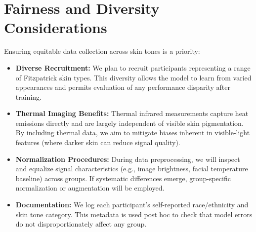 \section{Fairness and Diversity Considerations}
Ensuring equitable data collection across skin tones is a priority:
\begin{itemize}
    \item \textbf{Diverse Recruitment:} We plan to recruit participants representing a range of Fitzpatrick skin types. This diversity allows the model to learn from varied appearances and permits evaluation of any performance disparity after training.
    \item \textbf{Thermal Imaging Benefits:} Thermal infrared measurements capture heat emissions directly and are largely independent of visible skin pigmentation. By including thermal data, we aim to mitigate biases inherent in visible-light features (where darker skin can reduce signal quality).
    \item \textbf{Normalization Procedures:} During data preprocessing, we will inspect and equalize signal characteristics (e.g., image brightness, facial temperature baseline) across groups. If systematic differences emerge, group-specific normalization or augmentation will be employed.
    \item \textbf{Documentation:} We log each participant’s self-reported race/ethnicity and skin tone category. This metadata is used post hoc to check that model errors do not disproportionately affect any group.
\end{itemize}


